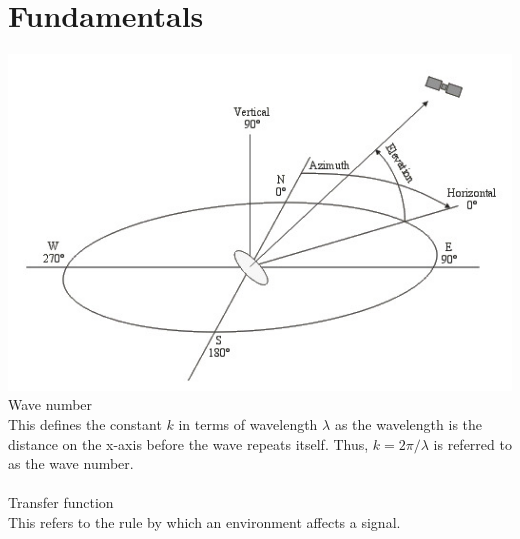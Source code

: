 \chapter{Fundamentals}
\label{chap:fundamentals}

\includegraphics[Elevation and azimuth angle]{images/Elevation_and_azimuth_angle.jpg}
\newpage
\LARGE
Wave number\\
\normalsize
This defines the constant $k$ in terms of wavelength $\lambda$ as the wavelength is the distance on the
x-axis before the wave repeats itself. Thus, $k = 2\pi/\lambda$ is referred to as the
wave number.\cite{Fuller1995}\\\\
\LARGE
Transfer function\\
\normalsize
This refers to the rule by which an environment affects a signal.\cite{Regulinski1962}